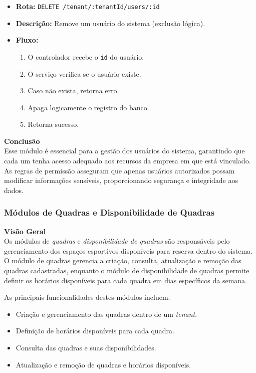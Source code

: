 \begin{itemize}
  \item \textbf{Rota:} \texttt{DELETE /tenant/:tenantId/users/:id}
  \item \textbf{Descrição:} Remove um usuário do sistema (exclusão lógica).
  \item \textbf{Fluxo:}
  \begin{enumerate}
    \item O controlador recebe o \texttt{id} do usuário.
    \item O serviço verifica se o usuário existe.
    \item Caso não exista, retorna erro.
    \item Apaga logicamente o registro do banco.
    \item Retorna sucesso.
  \end{enumerate}
\end{itemize}

\noindent\textbf{Conclusão} \\
Esse módulo é essencial para a gestão dos usuários do sistema, garantindo que cada um tenha acesso adequado aos recursos da empresa em que está vinculado. As regras de permissão asseguram que apenas usuários autorizados possam modificar informações sensíveis, proporcionando segurança e integridade aos dados.

\subsubsection{Módulos de Quadras e Disponibilidade de Quadras}\label{subsubsec:modulos_quadras_disponibilidade_quadras}

\noindent\textbf{Visão Geral}\\
Os módulos de \textit{quadras} e \textit{disponibilidade de quadras} são responsáveis pelo gerenciamento dos espaços esportivos disponíveis para reserva dentro do sistema. O módulo de quadras gerencia a criação, consulta, atualização e remoção das quadras cadastradas, enquanto o módulo de disponibilidade de quadras permite definir os horários disponíveis para cada quadra em dias específicos da semana.

As principais funcionalidades destes módulos incluem:

\begin{itemize}
    \item Criação e gerenciamento das quadras dentro de um \textit{tenant}.
    \item Definição de horários disponíveis para cada quadra.
    \item Consulta das quadras e suas disponibilidades.
    \item Atualização e remoção de quadras e horários disponíveis.
\end{itemize}

